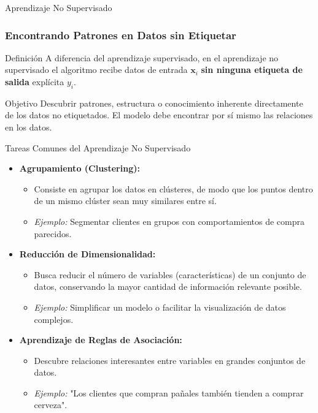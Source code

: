 \documentclass[aspectratio=169,xcolor=dvipsnames]{beamer}
\begin{document}
\begin{frame}{Aprendizaje No Supervisado}
    \frametitle{Encontrando Patrones en Datos sin Etiquetar}
    \begin{block}{Definición}
    A diferencia del aprendizaje supervisado, en el aprendizaje no supervisado el algoritmo recibe datos de entrada $\mathbf{x}_i$ \textbf{sin ninguna etiqueta de salida} explícita $y_i$.
    \end{block}
    
    \begin{alertblock}{Objetivo}
    Descubrir patrones, estructura o conocimiento inherente directamente de los datos no etiquetados. El modelo debe encontrar por sí mismo las relaciones en los datos.
    \end{alertblock}
\end{frame}


\begin{frame}{Tareas Comunes del Aprendizaje No Supervisado}
    \begin{itemize}
        \item<1-> \textbf{Agrupamiento (Clustering):}
            \begin{itemize}
                \item Consiste en agrupar los datos en clústeres, de modo que los puntos dentro de un mismo clúster sean muy similares entre sí.
                \item \textit{Ejemplo:} Segmentar clientes en grupos con comportamientos de compra parecidos.
            \end{itemize}
        \pause
        \item<2-> \textbf{Reducción de Dimensionalidad:}
            \begin{itemize}
                \item Busca reducir el número de variables (características) de un conjunto de datos, conservando la mayor cantidad de información relevante posible.
                \item \textit{Ejemplo:} Simplificar un modelo o facilitar la visualización de datos complejos.
            \end{itemize}
        \pause
        \item<3-> \textbf{Aprendizaje de Reglas de Asociación:}
             \begin{itemize}
                \item Descubre relaciones interesantes entre variables en grandes conjuntos de datos.
                \item \textit{Ejemplo:} "Los clientes que compran pañales también tienden a comprar cerveza".
            \end{itemize}
    \end{itemize}
\end{frame}
\end{document}
